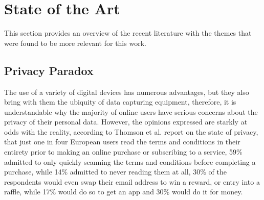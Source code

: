 %
%
\section{State of the Art} \label{section:state_of_the_art}

\par
This section provides an overview of the recent literature with the themes
that were found to be more relevant for this work.

\subsection{Privacy Paradox}

The use of a variety of digital devices has numerous advantages, but they
also bring with them the ubiquity of data capturing equipment, therefore,
it is understandable why the majority of online users have serious concerns
about the privacy of their personal data. However, the opinions expressed
are starkly at odds with the reality, according to Thomson et al. \cite{DarrenState}
report on the state of privacy, that just one in four European users read
the terms and conditions in their entirety prior to making an online purchase
or subscribing to a service, 59\% admitted to only quickly scanning the
terms and conditions before completing a purchase, while 14\% admitted to
never reading them at all, 30\% of the respondents would even swap their
email address to win a reward, or entry into a raffle, while 17\% would do
so to get an app and 30\% would do it for money.

